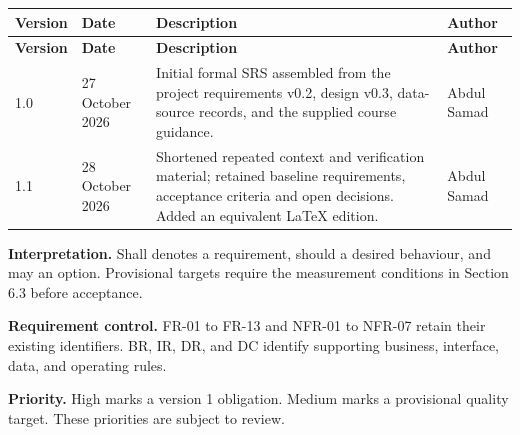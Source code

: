 \documentclass[11pt,letterpaper]{article}
\begin{document}
\begin{longtable}{|P{\arrayrulewidth\relax}|P{\arrayrulewidth\relax}|P{\arrayrulewidth\relax}|P{\arrayrulewidth\relax}|}

\hline{}

\textbf{Version} & \textbf{Date} & \textbf{Description} & \textbf{Author} \\ \hline

\endfirsthead

\hline{}

\textbf{Version} & \textbf{Date} & \textbf{Description} & \textbf{Author} \\ \hline

\endhead

\hline\endfoot

\hline\endlastfoot

1.0 & 27 October 2026 & Initial formal SRS assembled from the project requirements v0.2, design v0.3, data-source records, and the supplied course guidance. & Abdul Samad \\ \hline

1.1 & 28 October 2026 & Shortened repeated context and verification material; retained baseline requirements, acceptance criteria and open decisions. Added an equivalent LaTeX edition. & Abdul Samad \\ \hline

\end{longtable}

\endgroup

\textbf{Interpretation.} Shall denotes a requirement, should a desired behaviour, and may an option. Provisional targets require the measurement conditions in Section 6.3 before acceptance.\par

\textbf{Requirement control.} FR-01 to FR-13 and NFR-01 to NFR-07 retain their existing identifiers. BR, IR, DR, and DC identify supporting business, interface, data, and operating rules.\par

\textbf{Priority.} High marks a version 1 obligation. Medium marks a provisional quality target. These priorities are subject to review.\par

\clearpage

\begingroup\small\setlength{\parskip}{0pt}
\tableofcontents
\endgroup
\end{document}
